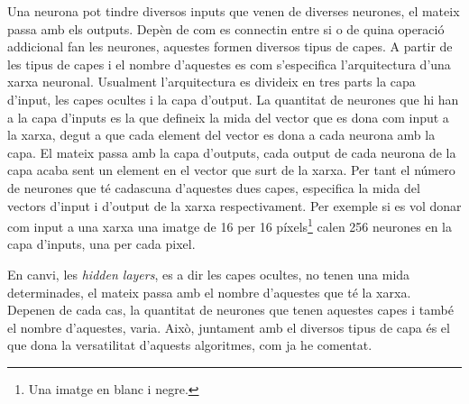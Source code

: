 Una neurona pot tindre diversos inputs que venen de diverses neurones, el mateix passa amb els outputs. Depèn de com es connectin entre si o de quina operació addicional fan les neurones, aquestes formen diversos tipus de capes. A partir de les tipus de capes i el nombre d'aquestes es com s'especifica l'arquitectura d'una xarxa neuronal. Usualment l'arquitectura es divideix en tres parts la capa d'input, les capes ocultes i la capa d'output. La quantitat de neurones que hi han a la capa d'inputs es la que defineix la mida del vector que es dona com input a la xarxa, degut a que cada element del vector es dona a cada neurona amb la capa. El mateix passa amb la capa d'outputs, cada output de cada neurona de la capa acaba sent un element en el vector que surt de la xarxa. Per tant el número de neurones que té cadascuna d'aquestes dues capes, especifica la mida del vectors d'input i d'output de la xarxa respectivament. Per exemple si es vol donar com input a una xarxa una imatge de 16 per 16 píxels\footnote{Una imatge en blanc i negre.} calen 256 neurones en la capa d'inputs, una per cada pixel. 

En canvi, les \textit{hidden layers}, es a dir les capes ocultes, no tenen una mida determinades, el mateix passa amb el nombre d'aquestes que té la xarxa. Depenen de cada cas, la quantitat de neurones que tenen aquestes capes i també el nombre d'aquestes, varia. Això, juntament amb el diversos tipus de capa és el que dona la versatilitat d'aquests algoritmes, com ja he comentat. 
 
